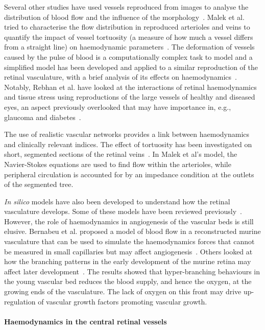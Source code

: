 \documentclass{article}
\begin{document}
Several other studies have used vessels reproduced from images to analyse the distribution of blood flow and the influence of the morphology~\cite{Malek_2014,Malek_2015,Rebhan_2019}.
Malek et al. tried to characterise the flow distribution in reproduced arterioles and veins to quantify the impact of vessel tortuosity (a measure of how much a vessel differs from a straight line) on haemodynamic parameters~\cite{Malek_2014,Malek_2015}.
The deformation of vessels caused by the pulse of blood is a computationally complex task to model and a simplified model has been developed and applied to a similar reproduction of the retinal vasculature, with a brief analysis of its effects on haemodynamics~\cite{Aletti_2016}.
Notably, Rebhan et al. have looked at the interactions of retinal haemodynamics and tissue stress using reproductions of the large vessels of healthy and diseased eyes, an aspect previously overlooked that may have importance in, e.g., glaucoma and diabetes~\cite{Rebhan_2019}.

The use of realistic vascular networks provides a link between haemodynamics and clinically relevant indices.
The effect of tortuosity has been investigated on short, segmented sections of the retinal veins~\cite{Malek_2014}.
In Malek et al's model, the Navier-Stokes equations are used to find flow within the arterioles, while peripheral circulation is accounted for by an impedance condition at the outlets of the segmented tree.

\textit{In silico} models have also been developed to understand how the retinal vasculature develops.
Some of these models have been reviewed previously~\cite{Arciero_2019,Roberts_2016}.
However, the role of haemodynamics in angiogenesis of the vascular beds is still elusive.
Bernabeu et al. proposed a model of blood flow in a reconstructed murine vasculature that can be used to simulate the haemodynamics forces that cannot be measured in small capillaries but may affect angiogenesis~\cite{Bernabeu_2014}.
Others looked at how the branching patterns in the early development of the murine retina may affect later development~\cite{Mirzapour_Shafiyi_2021}.
The results showed that hyper-branching behaviours in the young vascular bed reduces the blood supply, and hence the oxygen, at the growing ends of the vasculature.
The lack of oxygen on this front may drive up-regulation of vascular growth factors promoting vascular growth.


\paragraph*{Haemodynamics in the central retinal vessels}
\end{document}
